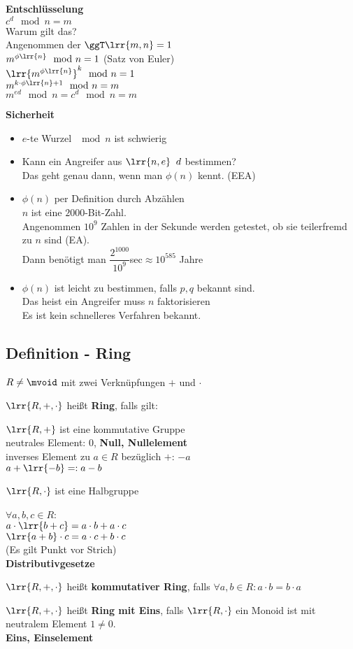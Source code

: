 	\textbf{Entschlüsselung}\\
	$c^d\mod n = m$\\
	Warum gilt das?\\
	Angenommen der $\ggT\lrr{m,n}=1$\\
	$m^{\phi\lrr{n}}\mod n=1$ (Satz von Euler)\\
	$\lrr{m^{\phi\lrr{n}}}^k\mod n = 1$\\
	$m^{k\cdot\phi\lrr{n}+1}\mod n = m$\\
	$m^{ed}\mod n = c^d\mod n=m$
	
	\textbf{Sicherheit}
	\begin{itemize}
		\item $e$-te Wurzel $\mod n$ ist schwierig
		\item Kann ein Angreifer aus $\lrr{n,e}\;\;d$ bestimmen?\\
			Das geht genau dann, wenn man $\phi(n)$ kennt. (EEA)
		\item $\phi(n)$ per Definition durch Abzählen\\
			$n$ ist eine $2000$-Bit-Zahl.\\
			Angenommen $10^9$ Zahlen in der Sekunde werden getestet, ob sie teilerfremd zu $n$ sind (EA).\\
			Dann benötigt man $\dfrac{2^1000}{10^9}$sec$\approx 10^{585}$ Jahre
		\item $\phi(n)$ ist leicht zu bestimmen, falls $p,q$ bekannt sind.\\
			Das heist ein Angreifer muss $n$ faktorisieren\\
			Es ist kein schnelleres Verfahren bekannt.
	\end{itemize}
\subsection{Definition - Ring}
	$R\neq\mvoid$ mit zwei Verknüpfungen $+$ und $\cdot$
		\item $\lrr{R,+,\cdot}$ heißt \textbf{Ring}, falls gilt:
				\item $\lrr{R,+}$ ist eine kommutative Gruppe\\
					neutrales Element: 0, \textbf{Null, Nullelement}\\
					inverses Element zu $a\in R$ bezüglich $+$: $-a$\\
					$a+\lrr{-b} =: a-b$
				\item $\lrr{R,\cdot}$ ist eine Halbgruppe
				\item $\forall a,b,c\in R$:\\
					$a\cdot\lrr{b+c}=a\cdot b+a\cdot c$\\
					$\lrr{a+b}\cdot c=a\cdot c+b\cdot c$\\
					(Es gilt Punkt vor Strich)\\
					\textbf{Distributivgesetze}
			\subExEnd
		\item $\lrr{R,+,\cdot}$ heißt \textbf{kommutativer Ring}, falls $\forall a,b\in R:a\cdot b=b\cdot a$
		\item $\lrr{R,+,\cdot}$ heißt \textbf{Ring mit Eins}, falls $\lrr{R,\cdot}$ ein Monoid ist mit neutralem Element $1\neq 0$.\\
			\textbf{Eins, Einselement}
	\subExEnd

